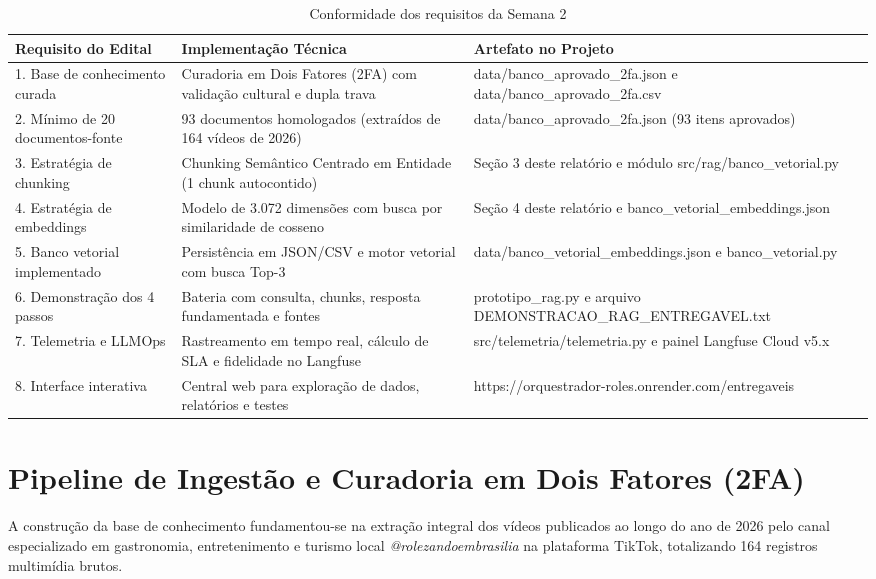 \documentclass[12pt,a4paper]{article}
\begin{document}
\begin{table}[H]
\centering
\small
\renewcommand{\arraystretch}{1.15}
\caption{Conformidade dos requisitos da Semana 2}
\begin{tabularx}{\textwidth}{p{4.0cm} p{4.6cm} X}
\toprule
\textbf{Requisito do Edital} & \textbf{Implementação Técnica} & \textbf{Artefato no Projeto} \\
\midrule
1. Base de conhecimento curada & Curadoria em Dois Fatores (2FA) com validação cultural e dupla trava & data/banco\_aprovado\_2fa.json e data/banco\_aprovado\_2fa.csv \\
2. Mínimo de 20 documentos-fonte & 93 documentos homologados (extraídos de 164 vídeos de 2026) & data/banco\_aprovado\_2fa.json (93 itens aprovados) \\
3. Estratégia de chunking & Chunking Semântico Centrado em Entidade (1 chunk autocontido) & Seção 3 deste relatório e módulo src/rag/banco\_vetorial.py \\
4. Estratégia de embeddings & Modelo de 3.072 dimensões com busca por similaridade de cosseno & Seção 4 deste relatório e banco\_vetorial\_embeddings.json \\
5. Banco vetorial implementado & Persistência em JSON/CSV e motor vetorial com busca Top-3 & data/\allowbreak banco\_vetorial\_embeddings.json e banco\_vetorial.py \\
6. Demonstração dos 4 passos & Bateria com consulta, chunks, resposta fundamentada e fontes & prototipo\_rag.py e arquivo DEMONSTRACAO\_RAG\_ENTREGAVEL.txt \\
7. Telemetria e LLMOps & Rastreamento em tempo real, cálculo de SLA e fidelidade no Langfuse & src/telemetria/telemetria.py e painel Langfuse Cloud v5.x \\
8. Interface interativa & Central web para exploração de dados, relatórios e testes & https://orquestrador-roles.onrender.com/entregaveis \\
\bottomrule
\end{tabularx}
\vspace{0.1cm}
\end{table}

\section{Pipeline de Ingestão e Curadoria em Dois Fatores (2FA)}

A construção da base de conhecimento fundamentou-se na extração integral dos vídeos publicados ao longo do ano de 2026 pelo canal especializado em gastronomia, entretenimento e turismo local \textit{@rolezandoembrasilia} na plataforma TikTok, totalizando 164 registros multimídia brutos.
\end{document}
